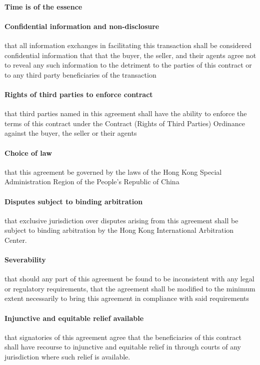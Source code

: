 \documentclass[10pt]{article}
\begin{document}
\paragraph{Time is of the essence}

\paragraph{Confidential information and non-disclosure} that all information exchanges in facilitating this transaction shall be considered confidential information that that the buyer, the seller, and their agents agree not to reveal any such information to the detriment to the parties of this contract or to any third party beneficiaries of the transaction

\paragraph{Rights of third parties to enforce contract} that third parties named in this agreement shall have the ability to enforce the terms of this contract under the Contract (Rights of Third Parties) Ordinance against the buyer, the seller or their agents

\paragraph{Choice of law} that this agreement be governed by the laws of the Hong Kong Special Administration Region of the People’s Republic of China

\paragraph{Disputes subject to binding arbitration} that exclusive
jurisdiction over disputes arising from this agreement shall be subject to binding arbitration by the Hong Kong International Arbitration Center.

\paragraph{Severability} that should any part of this agreement be found to be inconsistent with any legal or regulatory requirements, that the agreement shall be modified to the minimum extent necessarily to bring this agreement in compliance with said requirements

\paragraph{Injunctive and equitable relief available} that signatories of this agreement agree that the beneficiaries of this contract shall have recourse to injunctive and equitable relief in through courts of any jurisdiction where such relief is available.
\end{document}
